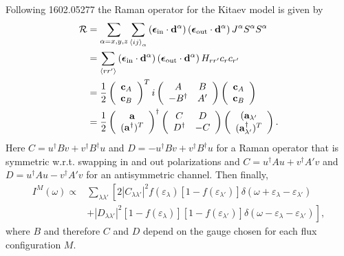 \documentclass[reprint,amsmath,amssymb,aps,prl,groupedaddress,nofootinbib,superscriptaddress]{revtex4-1}
\newcommand{\1}{\mathds{1}}
\begin{document}
Following 1602.05277 the Raman operator for the Kitaev model is given by 
\begin{align}
\mathcal{R} &= \sum_{\alpha = x,y,z} \sum_{\left<ij\right>_\alpha} \left({\boldsymbol \epsilon}_{\rm in} \cdot \mathbf{d}^\alpha \right) \left({\boldsymbol \epsilon}_{\rm out} \cdot \mathbf{d}^\alpha \right) J^\alpha S^\alpha S^\alpha  \\
& = \sum_{\left<rr'\right>} \left({\boldsymbol \epsilon}_{\rm in} \cdot \mathbf{d}^\alpha \right) \left({\boldsymbol \epsilon}_{\rm out} \cdot \mathbf{d}^\alpha \right) H_{rr'} c_r c_{r'} \\ %
&= \frac{1}{2}
\left(\begin{array}{c}
\mathbf{c}_A \\
\mathbf{c}_B 
\end{array}\right)^T
i\left(\begin{array}{cc}
A & B \\ -B^\dagger & A' 
\end{array}\right) \left(\begin{array}{c}
\mathbf{c}_A \\
\mathbf{c}_B 
\end{array}\right) \\
&= \frac{1}{2}
\left(\begin{array}{c}
\mathbf{a} \\
(\mathbf{a}^\dag)^T 
\end{array}\right)^\dagger
\left(\begin{array}{cc}
C & D \\ D^\dagger & -C 
\end{array}\right) \left(\begin{array}{c}(
\mathbf{a}_{\lambda'} \\
(\mathbf{a}_{\lambda'}^\dag)^T 
\end{array}\right).
\end{align}
Here \mbox{$C = u^\dag B v + v^\dag B^\dag u$} and \mbox{$D = -u^\dag B v + v^\dag B^\dag u$} for a Raman operator that is symmetric w.r.t. swapping in and out polarizations and \mbox{$C = u^\dag A u + v^\dag A' v$} and \mbox{$D = u^\dag A u - v^\dag A' v$} for an antisymmetric channel. %
Then finally,
\begin{align}
I^M(\omega) \propto& \sum_{\lambda \lambda'} \left[ 2 |C_{\lambda \lambda'}|^2 f(\varepsilon_\lambda)[1-f(\varepsilon_{\lambda'})] \delta(\omega+\varepsilon_\lambda -\varepsilon_{\lambda'}) \right. \nonumber \\
&\left. +|D_{\lambda \lambda'}|^2 [1-f(\varepsilon_{\lambda})][1-f(\varepsilon_{\lambda'})] \delta(\omega-\varepsilon_\lambda -\varepsilon_{\lambda'})
\right] ,
\end{align}
where $B$ and therefore $C$ and $D$ depend on the gauge chosen for each flux configuration $M$.
\end{document}
